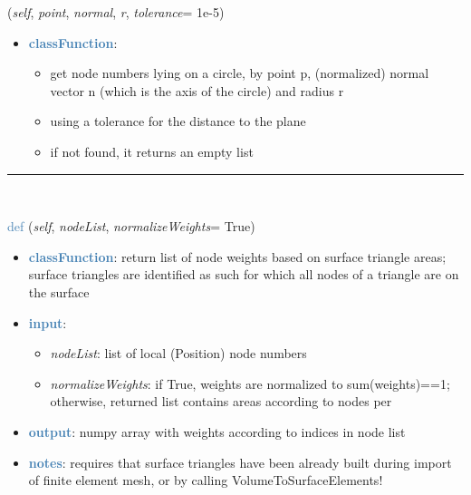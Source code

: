 \begin{itemize}[leftmargin=1.4cm]
\begin{itemize}[leftmargin=1.4cm]
\begin{itemize}[leftmargin=1.4cm]
\begin{itemize}[leftmargin=0.5cm]
\begin{itemize}[leftmargin=1.4cm]
\begin{itemize}[leftmargin=1.4cm]
\begin{itemize}[leftmargin=1.4cm]
\begin{itemize}[leftmargin=0.5cm]
\begin{flushleft}
({\it self}, {\it point}, {\it normal}, {\it r}, {\it tolerance}= 1e-5)
\end{flushleft}
\setlength{\itemindent}{0.7cm}
\begin{itemize}[leftmargin=0.7cm]
\item[--]\textcolor{steelblue}{\bf classFunction}: \vspace{-6pt}
\begin{itemize}[leftmargin=1.2cm]
\setlength{\itemindent}{-0.7cm}
\item[]get node numbers lying on a circle, by point p, (normalized) normal vector n (which is the axis of the circle) and radius r
\item[]using a tolerance for the distance to the plane
\item[]if not found, it returns an empty list
\end{itemize}
\vspace{12pt}\end{itemize}
%
\noindent\rule{8cm}{0.75pt}\vspace{1pt} \\ 
\begin{flushleft}
\noindent \textcolor{steelblue}{def {\bf {}}}\label{sec:FEM:FEMinterface:GetNodeWeightsFromSurfaceAreas}
({\it self}, {\it nodeList}, {\it normalizeWeights}= True)
\end{flushleft}
\setlength{\itemindent}{0.7cm}
\begin{itemize}[leftmargin=0.7cm]
\item[--]\textcolor{steelblue}{\bf classFunction}: return list of node weights based on surface triangle areas; surface triangles are identified as such for which all nodes of a triangle are on the surface
\item[--]\textcolor{steelblue}{\bf input}: \vspace{-6pt}
\begin{itemize}[leftmargin=1.2cm]
\setlength{\itemindent}{-0.7cm}
\item[]{\it nodeList}: list of local (Position) node numbers
\item[]{\it normalizeWeights}: if True, weights are normalized to sum(weights)==1; otherwise, returned list contains areas according to nodes per
\end{itemize}
\item[--]\textcolor{steelblue}{\bf output}: numpy array with weights according to indices in node list
\item[--]\textcolor{steelblue}{\bf notes}: requires that surface triangles have been already built during import of finite element mesh, or by calling VolumeToSurfaceElements!

\end{itemize}
\end{itemize}
\end{itemize}
\end{itemize}
\end{itemize}
\end{itemize}
\end{itemize}
\end{itemize}
\end{itemize}
